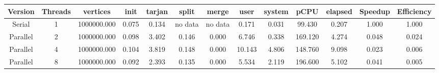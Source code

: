 \begin{tabular}{|c|c|c|c|c|c|c|c|c|c|c|c|c|}
\toprule
 Version &  Threads &    vertices &  init &  tarjan &   split &   merge &   user &  system &    pCPU &  elapsed &  Speedup &  Efficiency \\
\midrule
  Serial &        1 & 1000000.000 & 0.075 &   0.134 & no data & no data &  0.171 &   0.031 &  99.430 &    0.207 &    1.000 &       1.000 \\
Parallel &        2 & 1000000.000 & 0.098 &   3.402 &   0.146 &   0.000 &  6.746 &   0.338 & 169.120 &    4.274 &    0.048 &       0.024 \\
Parallel &        4 & 1000000.000 & 0.104 &   3.819 &   0.148 &   0.000 & 10.143 &   4.806 & 148.760 &    9.098 &    0.023 &       0.006 \\
Parallel &        8 & 1000000.000 & 0.092 &   2.393 &   0.135 &   0.000 &  5.534 &   2.119 & 196.600 &    5.102 &    0.041 &       0.005 \\
\bottomrule
\end{tabular}

